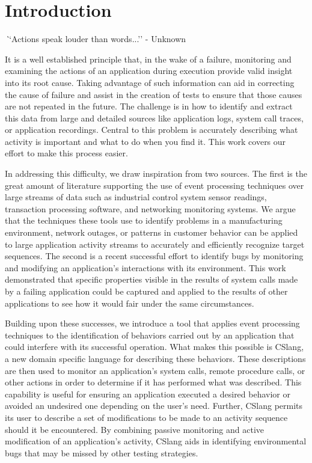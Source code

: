 \section{Introduction}
\label{SEC:introduction}


{\textit ``Actions speak louder than words...'' - Unknown}

It is a well established principle
that, in the wake of a failure,
monitoring and examining the actions
of an application
during execution provide valid insight
into its root cause.
Taking advantage of such information
can aid in correcting
the cause of failure
and assist in the creation
of tests to ensure
that those causes
are not repeated in the future.
The challenge is in
how to identify and extract this data
from large and detailed sources like application logs,
system call traces,
or application recordings.
Central to this problem
is accurately describing what activity is important
and what to do when you find it.
This work covers our effort to make this process easier.

In addressing this difficulty,
we draw inspiration from two sources.
The first is
the great amount of literature
supporting the use of event
processing techniques over large streams of data such as
industrial control system sensor readings,
transaction processing software,
and networking monitoring systems.
We argue that the techniques these tools use
to identify problems in a manufacturing environment,
network outages,
or patterns in customer behavior
can be applied
to large application activity streams to accurately
and efficiently recognize target sequences.
The second is a recent successful effort
to identify bugs by monitoring
and modifying an application's interactions with its environment.
This work demonstrated that specific properties
visible in the results of system calls
made by a failing application
could be captured and applied
to the results of other applications
to see how it would fair under the same circumstances.

Building upon these successes,
we introduce a tool
that applies event processing techniques
to the identification
of behaviors carried out by an application
that could interfere with its successful operation.
What makes this possible is CSlang,
a new domain specific language
for describing these behaviors.
These descriptions are then used
to monitor an application's system calls,
remote procedure calls,
or other actions in order to determine if it has
performed what was described.
This capability is useful
for ensuring an application executed a desired behavior
or avoided an undesired one
depending on the user's need.
Further, CSlang permits
its user to describe a set of modifications
to be made to an activity sequence should it be encountered.
By combining passive monitoring and active modification
of an application's activity,
CSlang aids in identifying environmental bugs
that may be missed by other testing strategies.

